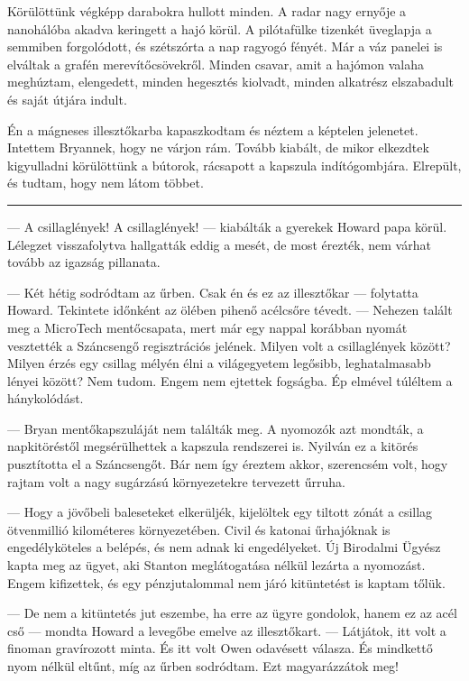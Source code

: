 \documentclass[10pt]{memoir}
\renewcommand{\pfbreakdisplay}{\bigskip \ding{70} \bigskip}
\newcommand{\secbreak}{\fancybreak{\pfbreakdisplay}}
\begin{document}
Körülöttünk végképp darabokra hullott minden. A radar nagy ernyője a nanohálóba
akadva keringett a hajó körül. A pilótafülke tizenkét üveglapja a semmiben
forgolódott, és szétszórta a nap ragyogó fényét. Már a váz panelei is elváltak
a grafén merevítőcsövekről. Minden csavar, amit a hajómon valaha meghúztam,
elengedett, minden hegesztés kiolvadt, minden alkatrész elszabadult és saját
útjára indult.

Én a mágneses illesztőkarba kapaszkodtam és néztem a képtelen jelenetet.
Intettem Bryannek, hogy ne várjon rám. Tovább kiabált, de mikor elkezdtek
kigyulladni körülöttünk a bútorok, rácsapott a kapszula indítógombjára.
Elrepült, és tudtam, hogy nem látom többet.

\secbreak
\itshape

— A csillaglények! A csillaglények! — kiabálták a gyerekek Howard papa körül.
Lélegzet visszafolytva hallgatták eddig a mesét, de most érezték, nem várhat
tovább az igazság pillanata.

— Két hétig sodródtam az űrben. Csak én és ez az illesztőkar — folytatta
Howard. Tekintete időnként az ölében pihenő acélcsőre tévedt. — Nehezen talált
meg a MicroTech mentőcsapata, mert már egy nappal korábban nyomát vesztették a
Száncsengő regisztrációs jelének. Milyen volt a csillaglények között? Milyen
érzés egy csillag mélyén élni a világegyetem legősibb, leghatalmasabb lényei
között? Nem tudom. Engem nem ejtettek fogságba. Ép elmével túléltem a
hánykolódást.

— Bryan mentőkapszuláját nem találták meg. A nyomozók azt mondták, a
napkitöréstől megsérülhettek a kapszula rendszerei is. Nyilván ez a kitörés
pusztította el a Száncsengőt. Bár nem így éreztem akkor, szerencsém volt, hogy
rajtam volt a nagy sugárzású környezetekre tervezett űrruha.

— Hogy a jövőbeli baleseteket elkerüljék, kijelöltek egy tiltott zónát a
csillag ötvenmillió kilométeres környezetében. Civil és katonai űrhajóknak is
engedélyköteles a belépés, és nem adnak ki engedélyeket. Új Birodalmi Ügyész
kapta meg az ügyet, aki Stanton meglátogatása nélkül lezárta a nyomozást. Engem
kifizettek, és egy pénzjutalommal nem járó kitüntetést is kaptam tőlük.

— De nem a kitüntetés jut eszembe, ha erre az ügyre gondolok, hanem ez az acél
cső — mondta Howard a levegőbe emelve az illesztőkart. — Látjátok, itt volt a
finoman gravírozott minta. És itt volt Owen odavésett válasza. És mindkettő
nyom nélkül eltűnt, míg az űrben sodródtam. Ezt magyarázzátok meg!
\end{document}
